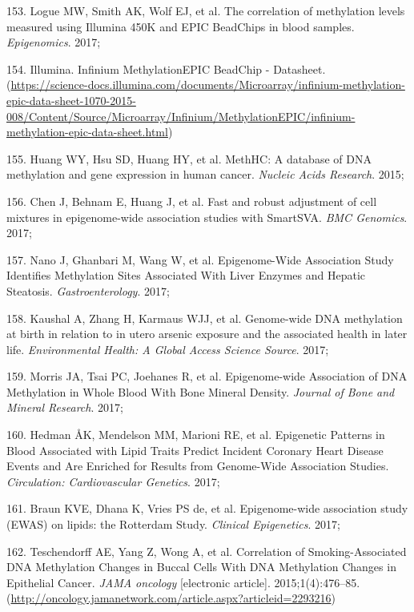 \documentclass[11pt,twoside]{bristolthesis}
\newenvironment{cslreferences}%
  {}%
  {\par}
\begin{document}
\begin{cslreferences}
\leavevmode\hypertarget{ref-Logue2017}{}%
153. Logue MW, Smith AK, Wolf EJ, et al. The correlation of methylation levels measured using Illumina 450K and EPIC BeadChips in blood samples. \emph{Epigenomics}. 2017;

\leavevmode\hypertarget{ref-IlluminaEPIC}{}%
154. Illumina. Infinium MethylationEPIC BeadChip - Datasheet. (\url{https://science-docs.illumina.com/documents/Microarray/infinium-methylation-epic-data-sheet-1070-2015-008/Content/Source/Microarray/Infinium/MethylationEPIC/infinium-methylation-epic-data-sheet.html})

\leavevmode\hypertarget{ref-Huang2015}{}%
155. Huang WY, Hsu SD, Huang HY, et al. MethHC: A database of DNA methylation and gene expression in human cancer. \emph{Nucleic Acids Research}. 2015;

\leavevmode\hypertarget{ref-Chen2017}{}%
156. Chen J, Behnam E, Huang J, et al. Fast and robust adjustment of cell mixtures in epigenome-wide association studies with SmartSVA. \emph{BMC Genomics}. 2017;

\leavevmode\hypertarget{ref-Nano2017}{}%
157. Nano J, Ghanbari M, Wang W, et al. Epigenome-Wide Association Study Identifies Methylation Sites Associated With Liver Enzymes and Hepatic Steatosis. \emph{Gastroenterology}. 2017;

\leavevmode\hypertarget{ref-Kaushal2017}{}%
158. Kaushal A, Zhang H, Karmaus WJJ, et al. Genome-wide DNA methylation at birth in relation to in utero arsenic exposure and the associated health in later life. \emph{Environmental Health: A Global Access Science Source}. 2017;

\leavevmode\hypertarget{ref-Morris2017}{}%
159. Morris JA, Tsai PC, Joehanes R, et al. Epigenome-wide Association of DNA Methylation in Whole Blood With Bone Mineral Density. \emph{Journal of Bone and Mineral Research}. 2017;

\leavevmode\hypertarget{ref-Hedman2017}{}%
160. Hedman ÅK, Mendelson MM, Marioni RE, et al. Epigenetic Patterns in Blood Associated with Lipid Traits Predict Incident Coronary Heart Disease Events and Are Enriched for Results from Genome-Wide Association Studies. \emph{Circulation: Cardiovascular Genetics}. 2017;

\leavevmode\hypertarget{ref-Braun2017}{}%
161. Braun KVE, Dhana K, Vries PS de, et al. Epigenome-wide association study (EWAS) on lipids: the Rotterdam Study. \emph{Clinical Epigenetics}. 2017;

\leavevmode\hypertarget{ref-Teschendorff2015}{}%
162. Teschendorff AE, Yang Z, Wong A, et al. Correlation of Smoking-Associated DNA Methylation Changes in Buccal Cells With DNA Methylation Changes in Epithelial Cancer. \emph{JAMA oncology} {[}electronic article{]}. 2015;1(4):476--85. (\url{http://oncology.jamanetwork.com/article.aspx?articleid=2293216})


\end{cslreferences}
\end{document}
